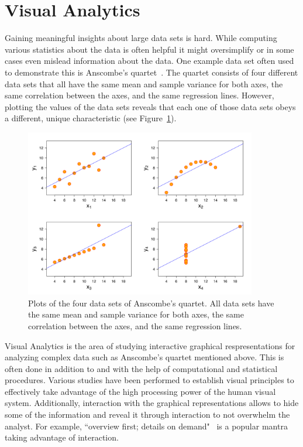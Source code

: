 \section{Visual Analytics}
Gaining meaningful insights about large data sets is hard.
While computing various statistics about the data is often helpful it might oversimplify or in some cases even mislead information about the data.
One example data set often used to demonstrate this is Anscombe's quartet~\cite{doi:10.1080/00031305.1973.10478966}.
The quartet consists of four different data sets that all have the same mean and sample variance for both axes, the same correlation between the axes, and the same regression lines.
However, plotting the values of the data sets reveals that each one of those data sets obeys a different, unique characteristic (see Figure~\ref{figs:anscombe}).

\begin{figure}[t]
\centering
\includegraphics[width=0.9\textwidth,valign=t]{tex/introduction/anscombe.png}
\caption[Anscombe's quartet.]{
Plots of the four data sets of Anscombe's quartet\footnotemark. All data sets have the same mean and sample variance for both axes, the same correlation between the axes, and the same regression lines.
}
\label{figs:anscombe}
\end{figure}

Visual Analytics is the area of studying interactive graphical respresentations for analyzing complex data such as Anscombe's quartet mentioned above.
This is often done in addition to and with the help of computational and statistical procedures.
Various studies \cite{doi:10.1080/01621459.1984.10478080,Treisman:1985:PPV:5088.5091,Chang:2002:GTV:820060.820062} have been performed to establish visual principles to effectively take advantage of the high processing power of the human visual system.
Additionally, interaction with the graphical representations allows to hide some of the information and reveal it through interaction to not overwhelm the analyst.
For example, ``overview first; details on demand"~\cite{Shneiderman96theeyes} is a popular mantra taking advantage of interaction.

